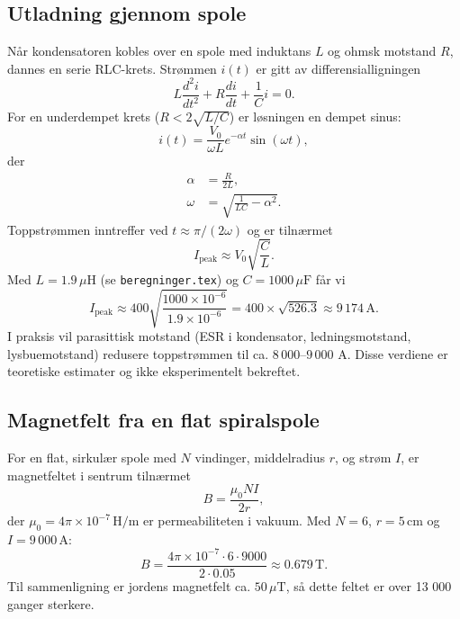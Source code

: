 \documentclass{article}
\begin{document}
\subsection{Utladning gjennom spole}
Når kondensatoren kobles over en spole med induktans $L$ og ohmsk motstand $R$, dannes en serie RLC-krets. Strømmen $i(t)$ er gitt av differensialligningen
\begin{equation}
L \frac{d^2 i}{dt^2} + R \frac{di}{dt} + \frac{1}{C} i = 0.
\end{equation}
For en underdempet krets ($R < 2\sqrt{L/C}$) er løsningen en dempet sinus:
\begin{equation}
i(t) = \frac{V_0}{\omega L} e^{-\alpha t} \sin(\omega t),
\end{equation}
der
\begin{align}
\alpha &= \frac{R}{2L}, \\
\omega &= \sqrt{\frac{1}{LC} - \alpha^2}.
\end{align}
Toppstrømmen inntreffer ved $t \approx \pi/(2\omega)$ og er tilnærmet
\begin{equation}
I_{\text{peak}} \approx V_0 \sqrt{\frac{C}{L}}.
\end{equation}
Med $L = 1.9\,\mu\text{H}$ (se \texttt{beregninger.tex}) og $C = 1000\,\mu\text{F}$ får vi
\begin{equation}
I_{\text{peak}} \approx 400 \sqrt{\frac{1000\times10^{-6}}{1.9\times10^{-6}}} = 400 \times \sqrt{526.3} \approx 9\,174\,\text{A}.
\end{equation}
I praksis vil parasittisk motstand (ESR i kondensator, ledningsmotstand, lysbuemotstand) redusere toppstrømmen til ca. $8\,000$--$9\,000$ A. Disse verdiene er teoretiske estimater og ikke eksperimentelt bekreftet.

\subsection{Magnetfelt fra en flat spiralspole}
For en flat, sirkulær spole med $N$ vindinger, middelradius $r$, og strøm $I$, er magnetfeltet i sentrum tilnærmet
\begin{equation}
B = \frac{\mu_0 N I}{2r},
\end{equation}
der $\mu_0 = 4\pi \times 10^{-7}\,\text{H/m}$ er permeabiliteten i vakuum. Med $N=6$, $r=5\,\text{cm}$ og $I=9\,000\,\text{A}$:
\begin{equation}
B = \frac{4\pi \times 10^{-7} \cdot 6 \cdot 9000}{2 \cdot 0.05} \approx 0.679\,\text{T}.
\end{equation}
Til sammenligning er jordens magnetfelt ca. $50\,\mu\text{T}$, så dette feltet er over 13 000 ganger sterkere.
\end{document}
